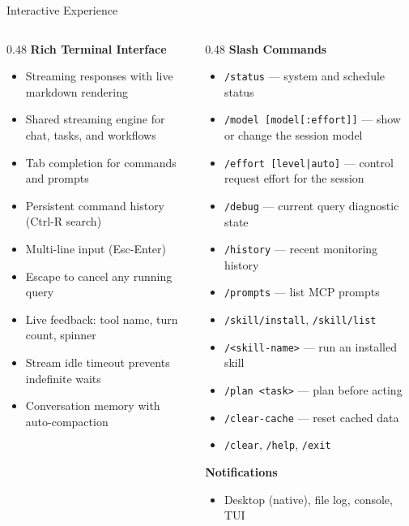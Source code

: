 \documentclass[aspectratio=169,10pt]{beamer}
\begin{document}
\begin{frame}{Interactive Experience}
\begin{columns}[T]
\begin{column}{0.48\textwidth}
\textbf{Rich Terminal Interface}
\begin{itemize}\scriptsize
  \item Streaming responses with live markdown rendering
  \item Shared streaming engine for chat, tasks, and workflows
  \item Tab completion for commands and prompts
  \item Persistent command history (Ctrl-R search)
  \item Multi-line input (Esc-Enter)
  \item Escape to cancel any running query
  \item Live feedback: tool name, turn count, spinner
  \item Stream idle timeout prevents indefinite waits
  \item Conversation memory with auto-compaction
\end{itemize}
\end{column}
\begin{column}{0.48\textwidth}
\textbf{Slash Commands}
\begin{itemize}\scriptsize
  \item \texttt{/status} --- system and schedule status
  \item \texttt{/model [model[:effort]]} --- show or change the session model
  \item \texttt{/effort [level|auto]} --- control request effort for the session
  \item \texttt{/debug} --- current query diagnostic state
  \item \texttt{/history} --- recent monitoring history
  \item \texttt{/prompts} --- list MCP prompts
  \item \texttt{/skill/install}, \texttt{/skill/list}
  \item \texttt{/<skill-name>} --- run an installed skill
  \item \texttt{/plan <task>} --- plan before acting
  \item \texttt{/clear-cache} --- reset cached data
  \item \texttt{/clear}, \texttt{/help}, \texttt{/exit}
\end{itemize}

\smallskip
\textbf{Notifications}
\begin{itemize}\scriptsize
  \item Desktop (native), file log, console, TUI
\end{itemize}
\end{column}
\end{columns}
\end{frame}
\end{document}
